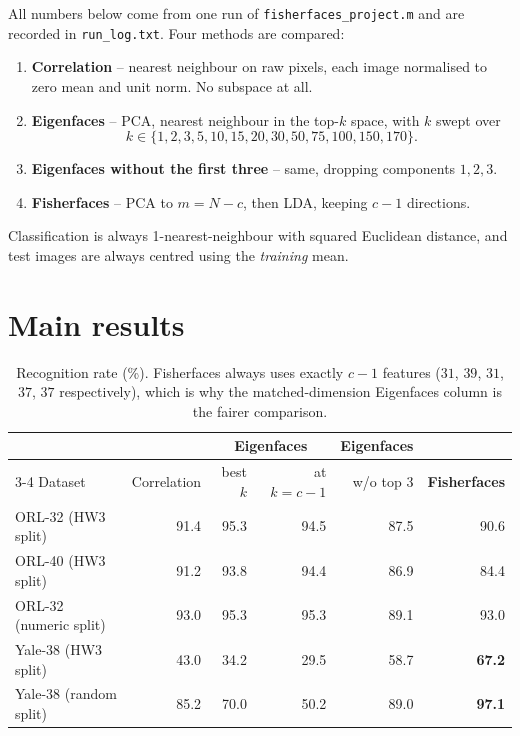 \documentclass[11pt]{article}
\theoremstyle{definition}
\theoremstyle{remark}
\begin{document}
All numbers below come from one run of \texttt{fisherfaces\_project.m} and are
recorded in \texttt{run\_log.txt}. Four methods are compared:
\begin{enumerate}[nosep,label=\arabic*.]
\item \textbf{Correlation} -- nearest neighbour on raw pixels, each image
  normalised to zero mean and unit norm. No subspace at all.
\item \textbf{Eigenfaces} -- PCA, nearest neighbour in the top-$k$ space, with $k$
  swept over
  \[ k \in \{1,2,3,5,10,15,20,30,50,75,100,150,170\}. \]
\item \textbf{Eigenfaces without the first three} -- same, dropping components
  $1,2,3$.
\item \textbf{Fisherfaces} -- PCA to $m=N-c$, then LDA, keeping $c-1$ directions.
\end{enumerate}
Classification is always 1-nearest-neighbour with squared Euclidean distance, and
test images are always centred using the \emph{training} mean.

\section{Main results}

\begin{table}[htbp]
\centering
\begin{tabular}{lrrrrr}
\toprule
 & & \multicolumn{2}{c}{Eigenfaces} & Eigenfaces & \\
\cmidrule(lr){3-4}
Dataset & Correlation & best $k$ & at $k=c-1$ & w/o top 3 & \textbf{Fisherfaces} \\
\midrule
ORL-32 (HW3 split)   & 91.4 & 95.3 & 94.5 & 87.5 & 90.6 \\
ORL-40 (HW3 split)   & 91.2 & 93.8 & 94.4 & 86.9 & 84.4 \\
ORL-32 (numeric split) & 93.0 & 95.3 & 95.3 & 89.1 & 93.0 \\
Yale-38 (HW3 split)  & 43.0 & 34.2 & 29.5 & 58.7 & \textbf{67.2} \\
Yale-38 (random split) & 85.2 & 70.0 & 50.2 & 89.0 & \textbf{97.1} \\
\bottomrule
\end{tabular}
\caption{Recognition rate (\%). Fisherfaces always uses exactly $c-1$ features
($31$, $39$, $31$, $37$, $37$ respectively), which is why the matched-dimension
Eigenfaces column is the fairer comparison.}
\label{tab:main}
\end{table}
\end{document}
